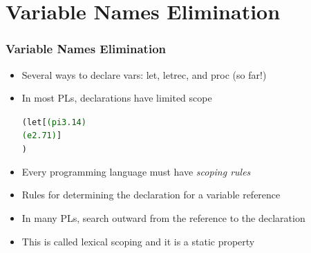 \documentclass{beamer}
\begin{document}
\section{Variable Names Elimination}

\begin{frame}[fragile]
\frametitle{Variable Names Elimination}
\begin{scriptsize}
\begin{itemize}
\item<1-> Several ways to declare vars: let, letrec, and proc (so far!)

\item<2-> In most PLs, declarations have limited scope
\begin{alltt}
(let [\textcolor{darkgreen}{(pi 3.14)}
	      \textcolor{darkgreen}{(e 2.71)}]
)
\end{alltt}

\item<2-> Every programming language must have \emph{scoping rules}

\item<2-> Rules for determining the declaration for a variable reference

\item<3> In many PLs, search outward from the reference to the declaration

\item<3-> This is called lexical scoping and it is a static property

\end{itemize}
\end{scriptsize}
\end{frame}
\end{document}
